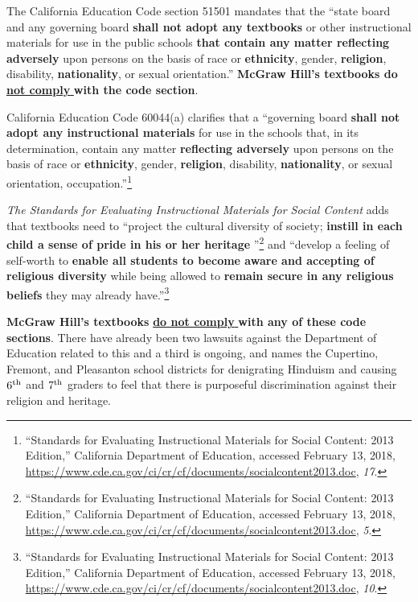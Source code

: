 The California Education Code section 51501 mandates that the “state board and any governing board \textbf{shall not adopt any textbooks} or other instructional materials for use in the public schools \textbf{that contain any matter reflecting adversely} upon persons on the basis of race or \textbf{ethnicity}, gender, \textbf{religion}, disability, \textbf{nationality}, or sexual orientation.” \textbf{McGraw Hill’s textbooks do} \underline{\textbf{not comply} } \textbf{with the code section}. 

California Education Code 60044(a) clarifies that a “governing board \textbf{shall not adopt any instructional materials} for use in the schools that, in its determination, contain any matter \textbf{reflecting adversely} upon persons on the basis of race or \textbf{ethnicity}, gender, \textbf{religion}, disability, \textbf{nationality}, or sexual orientation, occupation.”\footnote{“Standards for Evaluating Instructional Materials for Social Content: 2013 Edition,” California Department of Education, accessed February 13, 2018, \url{https://www.cde.ca.gov/ci/cr/cf/documents/socialcontent2013.doc}, \textit{17}.}

\textit{The Standards for Evaluating Instructional Materials for Social Content} adds that textbooks need to “project the cultural diversity of society; \textbf{instill in each child a sense of pride in his or her heritage} ”\footnote{“Standards for Evaluating Instructional Materials for Social Content: 2013 Edition,” California Department of Education, accessed February 13, 2018, \url{https://www.cde.ca.gov/ci/cr/cf/documents/socialcontent2013.doc}, \textit{5}.} and “develop a feeling of self-worth to \textbf{enable all students to become aware and accepting of religious diversity} while being allowed to \textbf{remain secure in any religious beliefs} they may already have.”\footnote{“Standards for Evaluating Instructional Materials for Social Content: 2013 Edition,” California Department of Education, accessed February 13, 2018, \url{https://www.cde.ca.gov/ci/cr/cf/documents/socialcontent2013.doc}, \textit{10}.}

\textbf{McGraw Hill’s textbooks} \underline{\textbf{do not comply} } \textbf{with any of these code sections}. There have already been two lawsuits against the Department of Education related to this and a third is ongoing, and names the Cupertino, Fremont, and Pleasanton school districts for denigrating Hinduism and causing $6^{\rm th}$ and $7^{\rm th}$ graders to feel that there is purposeful discrimination against their religion and heritage.


